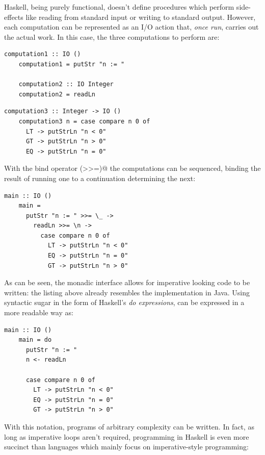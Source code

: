 \documentclass[UdineBachThesis,american,11pt]{PhdThesis}
\begin{document}
  Haskell, being purely functional, doesn't define procedures which perform
  side-effects like reading from standard input or writing to standard output.
  However, each computation can be represented as an I/O action that, \emph{once
  run}, carries out the actual work. In this case, the three computations to
  perform are:

  \begin{lstlisting}[gobble=4,basicstyle=\ttfamily\small]
    computation1 :: IO ()
    computation1 = putStr "n := "

    computation2 :: IO Integer
    computation2 = readLn
  \end{lstlisting}

  \newpage

  \begin{lstlisting}[gobble=4,basicstyle=\ttfamily\small]
    computation3 :: Integer -> IO ()
    computation3 n = case compare n 0 of
      LT -> putStrLn "n < 0"
      GT -> putStrLn "n > 0"
      EQ -> putStrLn "n = 0"
  \end{lstlisting}

  With the bind operator \lstinline@(>>=)@ the computations can be sequenced,
  binding the result of running one to a continuation determining the next:

  \begin{lstlisting}[gobble=4,basicstyle=\ttfamily\small]
    main :: IO ()
    main =
      putStr "n := " >>= \_ ->
        readLn >>= \n ->
          case compare n 0 of
            LT -> putStrLn "n < 0"
            EQ -> putStrLn "n = 0"
            GT -> putStrLn "n > 0"
  \end{lstlisting}

  As can be seen, the monadic interface allows for imperative looking code to be
  written: the listing above already resembles the implementation in Java. Using
  syntactic sugar in the form of Haskell's \emph{do expressions},
  \lstinline@main@ can be expressed in a more readable way as:

  \begin{lstlisting}[gobble=4,basicstyle=\ttfamily\small]
    main :: IO ()
    main = do
      putStr "n := "
      n <- readLn

      case compare n 0 of
        LT -> putStrLn "n < 0"
        EQ -> putStrLn "n = 0"
        GT -> putStrLn "n > 0"
  \end{lstlisting}

  With this notation, programs of arbitrary complexity can be written. In fact,
  as long as imperative loops aren't required, programming in Haskell is even
  more succinct than languages which mainly focus on imperative-style
  programming:
\end{document}
